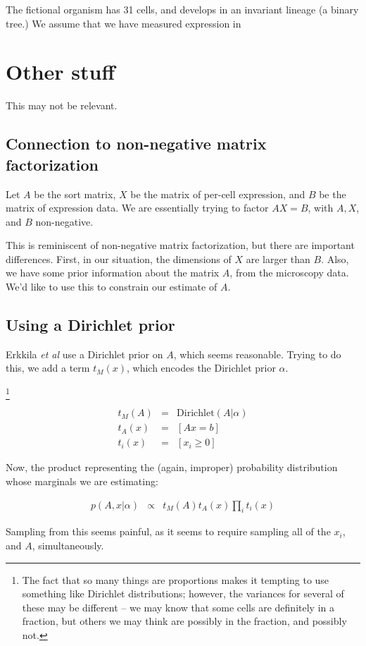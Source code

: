 \documentclass{article}
\begin{document}
The fictional organism has 31 cells, and develops in an invariant lineage
(a binary tree.) We assume that we have measured expression in






\section{Other stuff}

This may not be relevant.

\subsection{Connection to non-negative matrix factorization}

Let $A$ be the sort matrix, $X$ be the matrix of per-cell expression, and
$B$ be the matrix of expression data. We are essentially trying to factor
$AX=B$, with $A, X$, and $B$ non-negative.

This is reminiscent of non-negative matrix factorization, but
there are important differences. First, in our situation,
the dimensions of $X$ are larger than $B$. Also, we have some
prior information about
the matrix $A$, from the microscopy data.
We'd like to use this to constrain our estimate of $A$.




\subsection{Using a Dirichlet prior}

Erkkila {\em et al} use a Dirichlet prior on $A$, which seems reasonable. Trying to do
this, we add a term $t_M(x)$, which encodes the Dirichlet prior $\alpha$.

\footnote{The fact that so many things are proportions makes it tempting
to use something like Dirichlet distributions; however, the variances
for several of these may be different -- we may know that some cells
are definitely in a fraction, but others we may think are possibly 
in the fraction, and possibly not.}

\begin{eqnarray}
t_M(A) & = & \mathrm{Dirichlet}(A|\alpha) \\
t_A(x) & = & [Ax = b] \\
t_i(x) & = & [x_i \ge 0]
\end{eqnarray}

Now, the product representing the (again, improper) probability distribution
whose marginals we are estimating:

\begin{eqnarray}
p(A, x|\alpha) & \propto & t_M(A) t_A(x) \prod_i t_i(x)
\end{eqnarray}

Sampling from this seems painful, as it seems to require sampling all of
the $x_i$, and $A$, simultaneously.
\end{document}
